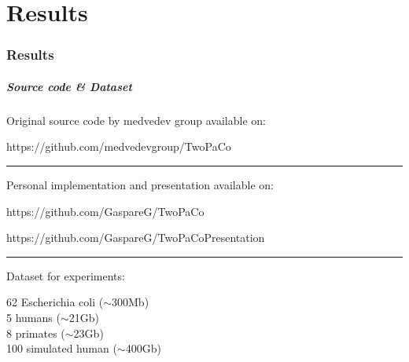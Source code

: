 \part{Results}
\section{Results}

\begin{frame}
	\partpage
	\centering
\end{frame}


\begin{frame}
	\frametitle{Source code \& Dataset}
	\centering
	
	Original source code by medvedev group available on:\\
	
	\medskip
	
	{\color{blue}https://github.com/medvedevgroup/TwoPaCo} \\
	
	\medskip
  \noindent\rule{4cm}{0.4pt}
	\medskip
	
	Personal implementation and presentation available on:\\
	\medskip

	{\color{blue}https://github.com/GaspareG/TwoPaCo}

	\medskip
	
	{\color{blue}https://github.com/GaspareG/TwoPaCoPresentation}
	
	\medskip
  \noindent\rule{4cm}{0.4pt}
	\medskip
		
	Dataset for experiments:

	\medskip
	
	62 Escherichia coli ({\color{green}$\sim$300Mb})\\
	5 humans ({\color{orange}$\sim$21Gb})\\
  8 primates ({\color{orange}$\sim$23Gb})\\
  100 simulated human ({\color{red}$\sim$400Gb})
	
	
\end{frame}


